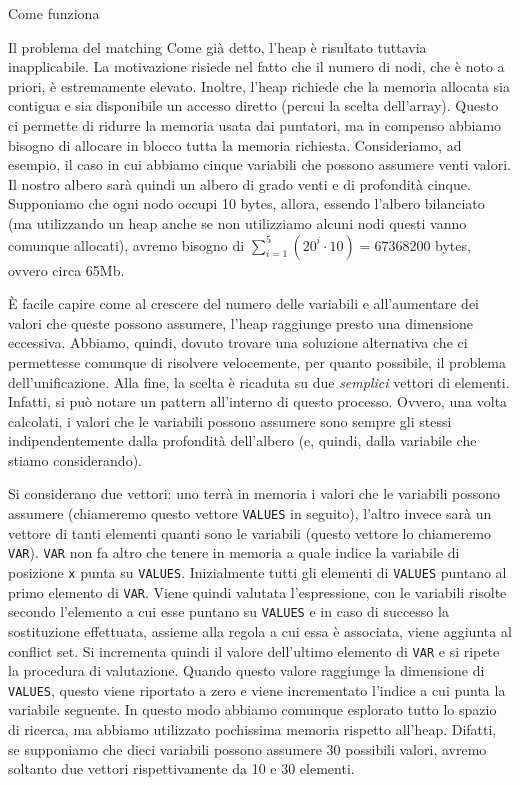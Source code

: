 \begin{chapter}{Come funziona}
\begin{section}{Il problema del matching}
Come gi\`a detto, l'heap \`e risultato tuttavia inapplicabile. La motivazione risiede
nel fatto che il numero di nodi, che \`e noto a priori, \`e estremamente elevato. Inoltre,
l'heap richiede che la memoria allocata sia contigua e sia disponibile un accesso diretto
(percui la scelta dell'array). Questo ci permette di ridurre la memoria usata dai puntatori,
ma in compenso abbiamo bisogno di allocare in blocco tutta la memoria richiesta.
Consideriamo, ad esempio, il caso in cui abbiamo cinque variabili che possono assumere venti
valori. Il nostro albero sar\`a quindi un albero di grado venti e di profondit\`a cinque.
Supponiamo che ogni nodo occupi 10 bytes, allora, essendo l'albero bilanciato (ma
utilizzando un heap anche se non utilizziamo alcuni nodi questi vanno comunque allocati),
avremo bisogno di $\sum_{i=1}^5{(20^i \cdot 10)} = 67368200$ bytes, ovvero circa 65Mb.

\`E facile capire come al crescere del numero delle variabili e all'aumentare dei valori che
queste possono assumere, l'heap raggiunge presto una dimensione eccessiva. Abbiamo, quindi,
dovuto trovare una soluzione alternativa che ci permettesse comunque di risolvere velocemente,
per quanto possibile, il problema dell'unificazione. Alla fine, la scelta \`e ricaduta
su due \textit{semplici} vettori di elementi. Infatti, si pu\`o notare un pattern all'interno
di questo processo. Ovvero, una volta calcolati, i valori che le variabili possono assumere
sono sempre gli stessi indipendentemente dalla profondit\`a dell'albero (e, quindi, dalla
variabile che stiamo considerando).

Si considerano due vettori: uno terr\`a in memoria i valori che le variabili possono assumere
(chiameremo questo vettore \verb,VALUES, in seguito), l'altro invece sar\`a un vettore di
tanti elementi quanti sono le variabili (questo vettore lo chiameremo \verb,VAR,).
\verb,VAR, non fa altro che tenere in memoria a quale indice la variabile di posizione \verb,x,
punta su \verb,VALUES,. Inizialmente tutti gli elementi di \verb,VALUES, puntano al primo
elemento di \verb,VAR,. Viene quindi valutata l'espressione, con le variabili risolte
secondo l'elemento a cui esse puntano su \verb,VALUES, e in caso di successo la sostituzione
effettuata, assieme alla regola a cui essa \`e associata, viene aggiunta al conflict set.
Si incrementa quindi il valore dell'ultimo elemento di \verb,VAR, e si ripete la procedura
di valutazione. Quando questo valore raggiunge la dimensione di \verb,VALUES,, questo
viene riportato a zero e viene incrementato l'indice a cui punta la variabile seguente.
In questo modo abbiamo comunque esplorato tutto lo spazio di ricerca, ma abbiamo utilizzato
pochissima memoria rispetto all'heap. Difatti, se supponiamo che dieci variabili possono
assumere 30 possibili valori, avremo soltanto due vettori rispettivamente da 10 e 30 elementi.


\end{section}
\end{chapter}

